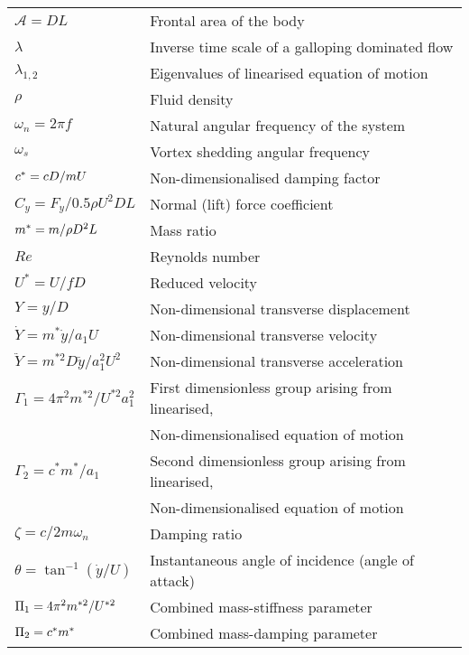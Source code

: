\begin{longtable}{p{}p{}}
$\mathcal{A}=DL$ & Frontal area of the body\\ 
$\lambda$ & Inverse time scale of a galloping dominated flow \\
$\lambda_{1,2}$ & Eigenvalues of linearised equation of motion \\
$\rho$ & Fluid density  \\
$\omega_n= 2 \pi f$ & Natural angular frequency of the system  \\
$\omega_s$ & Vortex shedding angular frequency \\
$c^{*}=cD/mU$ & Non-dimensionalised damping factor \\
$C_y=F_y/0.5\rho U^2DL$ & Normal (lift) force coefficient \\
$m^{*}=m/\rho D^2L$ & Mass ratio \\
$Re$ & Reynolds number  \\
$U^*=U/fD$ & Reduced velocity  \\
$Y=y/D$ & Non-dimensional transverse displacement \\
$\dot{Y}=m^*\dot{y}/a_1U$ & Non-dimensional transverse velocity \\
$\ddot{Y}=m^{*2}D\ddot{y}/a_1^2U^2$ & Non-dimensional transverse acceleration \\
$\Gamma_1 = 4\pi^2m^{*2}/U^{*2}a_1^2$ & First dimensionless group arising from linearised,\\ 
& Non-dimensionalised equation of motion\\
$\Gamma_2 = c^*m^*/a_1$ & Second dimensionless group arising from linearised,\\
& Non-dimensionalised equation of motion \\
$\zeta= c/2 m \omega_n$ & Damping ratio \\
$\theta= \tan^{-1}{(\dot{y}/U)}$ & Instantaneous angle of incidence (angle of attack)\\
$\Pi_1 =  4\pi^2m^{*2}/U^{*2}$ & Combined mass-stiffness parameter\\
$\Pi_2 = c^*m^*$ & Combined mass-damping parameter\\
\end{longtable} 